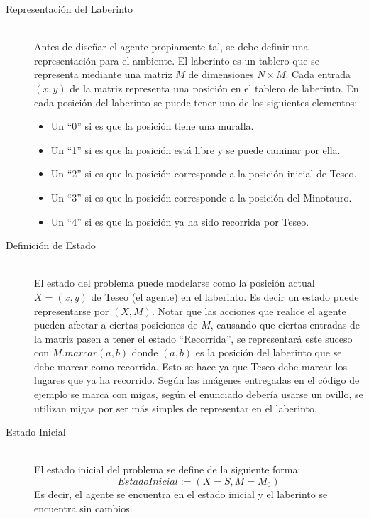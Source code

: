 \documentclass[letter, titlepage, 10pt]{article}
\begin{document}
\begin{description}
  \item[Representación del Laberinto] \hfill \\
  Antes de diseñar el agente propiamente tal, se debe definir una representación para el ambiente. El laberinto es un tablero que se representa mediante una matriz $M$ de dimensiones $N \times M$. Cada entrada $(x,y)$ de la matriz representa una posición en el tablero de laberinto. En cada posición del laberinto se puede tener uno de los siguientes elementos:
    \begin{itemize}
          \item Un ``0'' si es que la posición tiene una muralla.
          \item Un ``1'' si es que la posición está libre y se puede caminar por ella.
          \item Un ``2'' si es que la posición corresponde a la posición inicial de Teseo.
          \item Un ``3'' si es que la posición corresponde a la posición del Minotauro.
          \item Un ``4'' si es que la posición ya ha sido recorrida por Teseo.
    \end{itemize}
  \item[Definición de Estado] \hfill \\
  El estado del problema puede modelarse como la posición actual $X = (x,y)$ de Teseo (el agente) en el laberinto. Es decir un estado puede representarse por $(X, M)$. Notar que las acciones que realice el agente pueden afectar a ciertas posiciones de $M$, causando que ciertas entradas de la matriz pasen a tener el estado ``Recorrida'', se representará este suceso con $M.marcar(a,b)$ donde $(a,b)$ es la posición del laberinto que se debe marcar como recorrida. Esto se hace ya que Teseo debe marcar los lugares que ya ha recorrido. Según las imágenes entregadas en el código de ejemplo se marca con migas, según el enunciado debería usarse un ovillo, se utilizan migas por ser más simples de representar en el laberinto.
   
    \item[Estado Inicial] \hfill \\
    El estado inicial del problema se define de la siguiente forma:
  \begin{displaymath}
    EstadoInicial := \left(X = S, M = M_0\right)
  \end{displaymath}
  Es decir, el agente se encuentra en el estado inicial y el laberinto se encuentra sin cambios.


\end{description}
\end{document}
